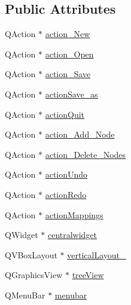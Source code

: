 \subsection*{Public Attributes}
\begin{DoxyCompactItemize}
\item 
Q\+Action $\ast$ \mbox{\hyperlink{class_ui___dt_editor_window_a62cbe96988d4be59f0444b6a1530901f}{action\+\_\+\+New}}
\item 
Q\+Action $\ast$ \mbox{\hyperlink{class_ui___dt_editor_window_ab397abdfeb92bb9a1f6e0931e07f425c}{action\+\_\+\+Open}}
\item 
Q\+Action $\ast$ \mbox{\hyperlink{class_ui___dt_editor_window_a632a31ae4745f8fdd9b7be338a1752d9}{action\+\_\+\+Save}}
\item 
Q\+Action $\ast$ \mbox{\hyperlink{class_ui___dt_editor_window_a022105055d5f4fb1d14651610e92eb32}{action\+Save\+\_\+as}}
\item 
Q\+Action $\ast$ \mbox{\hyperlink{class_ui___dt_editor_window_adfef7d6b8ca83ffb037626e1674c4ca2}{action\+Quit}}
\item 
Q\+Action $\ast$ \mbox{\hyperlink{class_ui___dt_editor_window_aba3a3f68df1b8cb684a0169f03374399}{action\+\_\+\+Add\+\_\+\+Node}}
\item 
Q\+Action $\ast$ \mbox{\hyperlink{class_ui___dt_editor_window_a24dee0ca6c0bca63c19b424d6043658f}{action\+\_\+\+Delete\+\_\+\+Nodes}}
\item 
Q\+Action $\ast$ \mbox{\hyperlink{class_ui___dt_editor_window_a6c3535976aec9b374552e412297566a7}{action\+Undo}}
\item 
Q\+Action $\ast$ \mbox{\hyperlink{class_ui___dt_editor_window_ad146a51ed409b517b572f1811ae19c75}{action\+Redo}}
\item 
Q\+Action $\ast$ \mbox{\hyperlink{class_ui___dt_editor_window_a4115113afae591ab5b9225bd104153d0}{action\+Mappings}}
\item 
Q\+Widget $\ast$ \mbox{\hyperlink{class_ui___dt_editor_window_afd7a6dc2124440f793ae24e70ffeeee8}{centralwidget}}
\item 
Q\+V\+Box\+Layout $\ast$ \mbox{\hyperlink{class_ui___dt_editor_window_af7ecc4f1b472fb6339a1817d9122764b}{vertical\+Layout\+\_}}
\item 
Q\+Graphics\+View $\ast$ \mbox{\hyperlink{class_ui___dt_editor_window_aa2008179933df5f7955481d1c29d9ce7}{tree\+View}}
\item 
Q\+Menu\+Bar $\ast$ \mbox{\hyperlink{class_ui___dt_editor_window_a962541c8c6baebd893ec0d074c7c5c43}{menubar}}
\item 

\end{DoxyCompactItemize}
